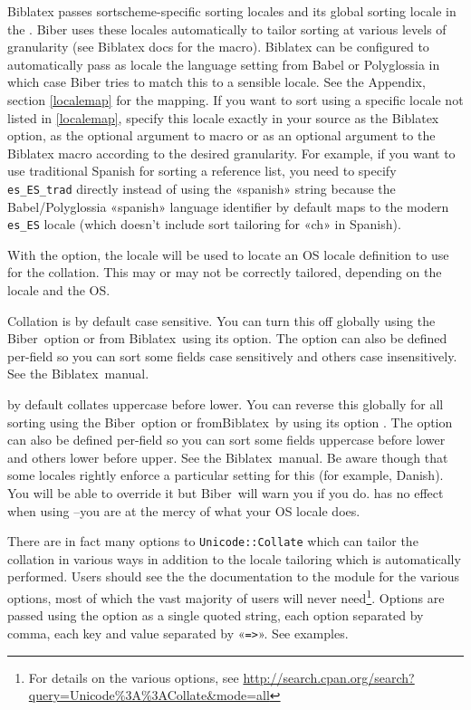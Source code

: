 \documentclass{ltxdockit}
\newcommand*{\biber}{Biber\xspace}
\newcommand*{\biblatex}{Biblatex\xspace}
\begin{document}
\biblatex passes sortscheme-specific sorting locales and its global sorting
locale in the . \biber uses these locales automatically to
tailor sorting at various levels of granularity (see \biblatex docs for the
 macro). \biblatex can be configured to
automatically pass as locale the language setting from Babel or Polyglossia
in which case \biber tries to match this to a sensible locale. See the
Appendix, section \ref{localemap} for the mapping. If you want to sort
using a specific locale not listed in \ref{localemap}, specify this locale
exactly in your \latex source as the \biblatex {} option, as
the optional argument to  macro or as an optional
argument to the \biblatex {} macro according to the desired
granularity. For example, if you want to use traditional Spanish for
sorting a reference list, you need to specify \verb+es_ES_trad+ directly
instead of using the «spanish» string because the Babel/Polyglossia
«spanish» language identifier by default maps to the modern \verb+es_ES+
locale (which doesn't include sort tailoring for «ch» in Spanish).

With the  option, the locale will be
used to locate an OS locale definition to use for the collation. This
may or may not be correctly tailored, depending on the locale and the OS.

Collation is by default case sensitive. You can turn this
off globally using the \biber\ option  or from
\biblatex\ using its option\linebreak[4]. The option can also
be defined per-field so you can sort some fields case sensitively and
others case insensitively. See the \biblatex\ manual.

 by default collates uppercase before lower.
You can reverse this globally for all sorting using the \biber\ option
 or from\linebreak[4]\biblatex\ by using its option
. The option can also be defined per-field so you can
sort some fields uppercase before lower and others lower before upper. See the
\biblatex\ manual. Be aware though that some locales rightly enforce a
particular setting for this (for example, Danish). You will be able to
override it but \biber\ will warn you if you do.  has
no effect when using --you are at the mercy of what
your OS locale does.

There are in fact many options to \verb+Unicode::Collate+
which can tailor the collation in various ways in
addition to the locale tailoring which is automatically performed.
Users should see the the documentation to the module for the various
options, most of which the vast majority of users will never
need\footnote{For details on the various options, see
  \url{http://search.cpan.org/search?query=Unicode\%3A\%3ACollate&mode=all}}.
Options are passed using the  option as a
single quoted string, each option separated by comma, each key and
value separated by «\verb+=>+». See examples.
\end{document}
